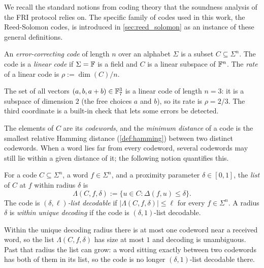 We recall the standard notions from coding theory that the soundness
analysis of the FRI protocol relies on. The specific family of codes
used in this work, the Reed-Solomon codes, is introduced in
\cref{sec:reed_solomon} as an instance of these general definitions.

\begin{definition}
\label{def:code}
An \emph{error-correcting code} of length $n$ over an alphabet
$\Sigma$ is a subset $C \subseteq \Sigma^n$. The code is a
\emph{linear code} if $\Sigma = \mathbb{F}$ is a field and $C$ is a linear
subspace of $\mathbb{F}^n$. The \emph{rate} of a linear code is
$\rho := \dim(C)/n$.
\end{definition}

\begin{example}
\label{ex:code}
The set of all vectors $(a, b, a+b) \in \mathbb{F}_7^3$ is a linear code of
length $n = 3$: it is a subspace of dimension $2$ (the free choices $a$
and $b$), so its rate is $\rho = 2/3$. The third coordinate is a
built-in check that lets some errors be detected.
\end{example}

The elements of $C$ are its \emph{codewords}, and the \emph{minimum
distance} of a code is the smallest relative Hamming distance
(\cref{def:hamming}) between two distinct codewords. When a word lies
far from every codeword, several codewords may still lie within a given
distance of it; the following notion quantifies this.

\begin{definition}
\label{def:list_decoding}
For a code $C \subseteq \Sigma^n$, a word $f \in \Sigma^n$, and a
proximity parameter $\delta \in [0,1]$, the \emph{list} of $C$ at $f$
within radius $\delta$ is
%
\[
\Lambda(C, f, \delta) := \{u \in C : \Delta(f, u) \leq \delta\}.
\]
%
The code is \emph{$(\delta, \ell)$-list decodable} if
$|\Lambda(C, f, \delta)| \leq \ell$ for every $f \in \Sigma^n$. A
radius $\delta$ is \emph{within unique decoding} if the code is
$(\delta, 1)$-list decodable.
\end{definition}

\begin{example}
\label{ex:list_decoding}
Within the unique decoding radius there is at most one codeword near a
received word, so the list $\Lambda(C, f, \delta)$ has size at most $1$
and decoding is unambiguous. Past that radius the list can grow: a word
sitting exactly between two codewords has both of them in its list, so
the code is no longer $(\delta,1)$-list decodable there.
\end{example}


